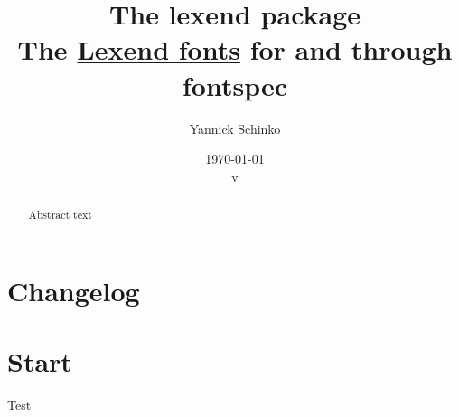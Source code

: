 \documentclass[12pt,oneside,a4paper]{memoir}
\begin{document}
\title{
	The \textsf{lexend} package\\
	\small{The \href{https://www.lexend.com/}{\textsf{Lexend} fonts} for \XeLaTeX{} and \LuaLaTeX{} through \textsf{fontspec}}
}
\author{
	Yannick Schinko
}
\date{
	\today\\
	v%
}

\maketitle
\newpage

\begin{abstract}
Abstract text
\end{abstract}
\newpage

\tableofcontents
\newpage


\chapter{Changelog}


\chapter{Start}

Test
\end{document}
